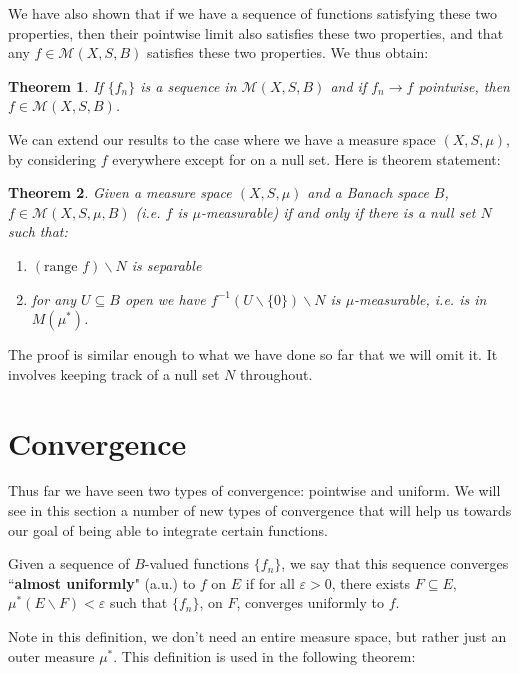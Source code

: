 \documentclass[a4paper,12pt]{report}
\newcommand{\ms}[1]{\mathscr{#1}}
\newcommand{\range}{ \text{range } }
\newcommand{\inv}[1] { #1^{-1} }
\newcommand{\varep}{ \varepsilon }
\newcommand{\sse} {\subseteq}
\newtheorem{theorem}{Theorem}[section]
\newenvironment{definition}[1][Definition.]{\begin{trivlist}
\item[\hskip \labelsep {\bfseries #1}]}{\end{trivlist}}
\begin{document}
	\noindent We have also shown that if we have a sequence of functions satisfying these two properties, then their pointwise limit also satisfies these two properties, and that any $f \in \ms{M}(X, S, B)$ satisfies these two properties. We thus obtain:
	
	\begin{theorem}
	If $\{f_n\}$ is a sequence in $\ms{M}(X, S, B)$ and if $f_n \rightarrow f$ pointwise, then $f \in \ms{M}(X, S, B)$. 
	\end{theorem}
	
	\noindent We can extend our results to the case where we have a measure space $(X, S, \mu)$, by considering $f$ everywhere except for on a null set. Here is theorem statement:
	\begin{theorem}
	Given a measure space $(X, S, \mu)$ and a Banach space $B$, $f \in \ms{M}(X, S, \mu, B)$ (i.e. $f$ is $\mu$-measurable) if and only if there is a null set $N$ such that:
		\begin{enumerate}[label=(\alph*)]
			\item $(\range f) \backslash N$ is separable
			\item for any $U \sse B$ open  we have $\inv{f}(U \backslash \{0\}) \backslash N$ is $\mu$-measurable, i.e. is in $M(\mu^*)$. 
		\end{enumerate}
	\end{theorem}
	\noindent The proof is similar enough to what we have done so far that we will omit it. It involves keeping track of a null set $N$ throughout. 
	
	\section{Convergence}
	
	Thus far we have seen two types of convergence: pointwise and uniform. We will see in this section a number of new types of convergence that will help us towards our goal of being able to integrate certain functions. 
	
	\begin{definition}
	Given a sequence of $B$-valued functions $\{f_n\}$, we say that this sequence converges ``\textbf{almost uniformly}" (a.u.) to $f$ on $E$ if for all $\varep > 0$, there exists $F \sse E$, $\mu^*(E \backslash F) < \varep$ such that $\{f_n\}$, on $F$, converges uniformly to $f$. 
	\end{definition}
	
	\noindent Note in this definition, we don't need an entire measure space, but rather just an outer measure $\mu^*$. This definition is used in the following theorem:
	
\end{document}
